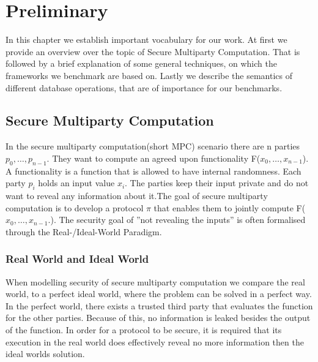 \chapter{Preliminary}
In this chapter we establish important vocabulary for our work. At first we provide an overview over the topic of Secure Multiparty Computation. That is followed by a brief explanation of some general techniques, on which the frameworks we benchmark are based on. 
Lastly we describe the semantics of different database operations, that are of importance for our benchmarks.  
\section{Secure Multiparty Computation}
In the secure multiparty computation(short MPC) scenario there are n parties 
$ p_0,\dots,p_{n-1} $. They want to compute an agreed upon functionality F($ x_0,\dots,x_{n-1} $). A functionality is a function that is allowed to have internal randomness. 
Each party $ p_i $ holds an input value $ x_i $. 
The parties keep their input private and do not want to reveal any information about it.The goal of secure multiparty computation is to develop a protocol  $ \pi $ that enables them to jointly compute F($ x_0,\dots,x_{n-1}. $). The security goal of ''not revealing the inputs'' is often formalised through the Real-/Ideal-World Paradigm. 


\subsection{Real World and Ideal World}
When modelling security of secure multiparty computation we compare the real world, to a perfect ideal world, where the problem can be solved in a perfect way. In the perfect world, there exists a trusted third party that evaluates the function for the other parties. Because of this, no information is leaked besides the output of the function. In order for a protocol to be secure, it is required that its execution in the real world does effectively reveal no more information then the ideal worlds solution.   

